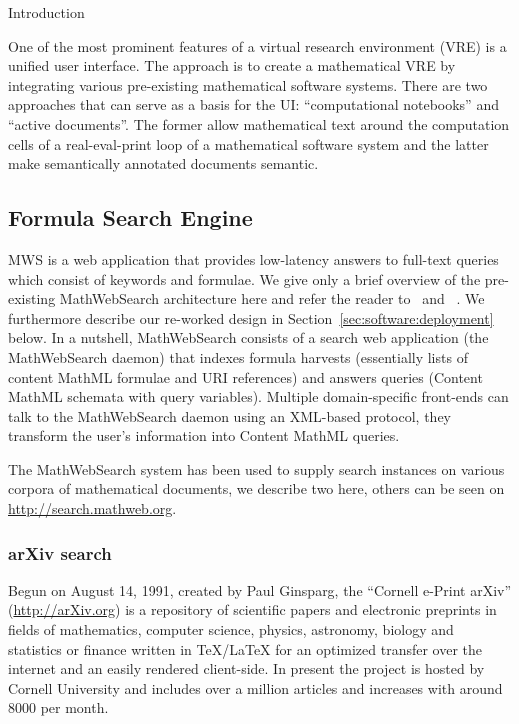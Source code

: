 \def\MWS{MathWebSearch\xspace}

\begin{newpart}{Introduction}

One of the most prominent features of a virtual research environment (VRE) is a unified user interface. 
The \pn approach is to create a mathematical VRE by integrating various
pre-existing mathematical software systems. There are two approaches that can serve as a
basis for the \pn UI: ``computational notebooks'' and ``active documents''. The former
allow mathematical text around the computation cells of a real-eval-print loop of a
mathematical software system and the latter make semantically annotated documents
semantic.


\end{newpart}

\subsection{Formula Search Engine}

MWS is a web application that provides low-latency answers to full-text queries which consist of keywords and formulae.
We give only a brief overview of the pre-existing \MWS architecture here and refer the reader to~\cite{ProKoh:mwssofse12} and ~\cite{ODK-D6.1}. 
We furthermore describe our re-worked design in Section~\ref{sec:software:deployment} below.
In a nutshell, \MWS consists of a search web application (the \MWS daemon) that indexes formula harvests (essentially lists of content MathML formulae and URI references) and answers queries (Content MathML schemata with query variables).
Multiple domain-specific front-ends can talk to the \MWS daemon using an XML-based protocol, they transform the user's information into Content MathML queries. 

The \MWS system has been used to supply search instances on various corpora of mathematical documents, we describe two here, others can be seen on \url{http://search.mathweb.org}. 

\subsubsection{arXiv search}

Begun on August 14, 1991, created by Paul Ginsparg, the ``Cornell e-Print arXiv'' (\url{http://arXiv.org}) is a repository of scientific papers and electronic preprints in
fields of mathematics, computer science, physics, astronomy, biology and statistics or finance written in {\TeX/\LaTeX} for an optimized transfer over the internet and an easily rendered client-side.
In present the project is hosted by Cornell University and includes over a million articles and increases with around 8000 per month.

